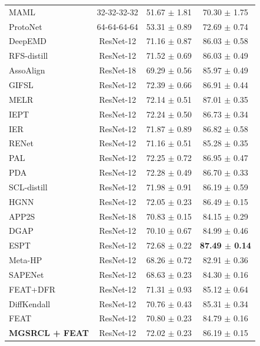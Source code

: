 {\begin{xltabular}{\textwidth}{lCCC}
MAML \cite{MAML} & 32-32-32-32 & 51.67 $\pm$ 1.81 & 70.30 $\pm$ 1.75 \\
ProtoNet \cite{ProtoNet} & 64-64-64-64  & 53.31 $\pm$ 0.89 & 72.69 $\pm$ 0.74 \\
DeepEMD \cite{DeepEMD} & ResNet-12 & 71.16 $\pm$ 0.87 & 86.03 $\pm$ 0.58 \\
RFS-distill \cite{RFS} & ResNet-12 & 71.52 $\pm$ 0.69 & 86.03 $\pm$ 0.49 \\
AssoAlign \cite{AssoAlign} & ResNet-18 & 69.29 $\pm$ 0.56 & 85.97 $\pm$ 0.49 \\
GIFSL \cite{GIFSL} & ResNet-12 & 72.39 $\pm$ 0.66 & 86.91 $\pm$ 0.44 \\
MELR \cite{MELR} & ResNet-12 & 72.14 $\pm$ 0.51 & 87.01 $\pm$ 0.35 \\
IEPT \cite{IEPT} & ResNet-12 & 72.24 $\pm$ 0.50 & 86.73 $\pm$ 0.34 \\
IER \cite{IER} & ResNet-12 & 71.87 $\pm$ 0.89 & 86.82 $\pm$ 0.58 \\
RENet \cite{RENet} & ResNet-12 & 71.16 $\pm$ 0.51 & 85.28 $\pm$ 0.35 \\
PAL \cite{PAL} & ResNet-12 & 72.25 $\pm$ 0.72 & 86.95 $\pm$ 0.47 \\
PDA \cite{PDA} & ResNet-12 & 72.28 $\pm$ 0.49 & 86.70 $\pm$ 0.33 \\
SCL-distill \cite{Spatial} & ResNet-12 & 71.98 $\pm$ 0.91 & 86.19 $\pm$ 0.59 \\
HGNN \cite{HGNN} & ResNet-12 & 72.05 $\pm$ 0.23 & 86.49 $\pm$ 0.15 \\
APP2S \cite{APP2S} & ResNet-18 & 70.83 $\pm$ 0.15 & 84.15 $\pm$ 0.29 \\
DGAP \cite{DGAP} & ResNet-12 & 70.10 $\pm$ 0.67 & 84.99 $\pm$ 0.46 \\
ESPT \cite{ESPT} & ResNet-12 & 72.68 $\pm$ 0.22 & \textbf{87.49 $\pm$ 0.14} \\
Meta-HP \cite{Meta-HP} & ResNet-12 & 68.26 $\pm$ 0.72 & 82.91 $\pm$ 0.36 \\
SAPENet \cite{SAPENet} & ResNet-12 & 68.63 $\pm$ 0.23 & 84.30 $\pm$ 0.16 \\
FEAT+DFR \cite{DFR} & ResNet-12 & 71.31 $\pm$ 0.93 & 85.12 $\pm$ 0.64 \\
DiffKendall \cite{DiffKendall} & ResNet-12 & 70.76 $\pm$ 0.43 & 85.31 $\pm$ 0.34 \\
\midrule
FEAT \cite{FEAT} & ResNet-12 & 70.80 $\pm$ 0.23 & 84.79 $\pm$ 0.16 \\
\textbf{MGSRCL + FEAT} & ResNet-12 & 72.02 $\pm$ 0.23  & 86.19 $\pm$ 0.15 \\

\end{xltabular}}
